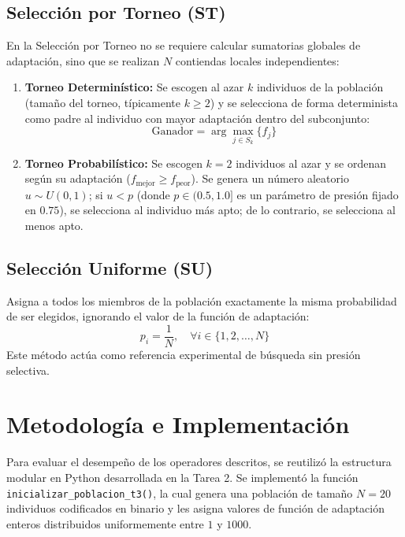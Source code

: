 \documentclass[11pt,letterpaper]{article}
\begin{document}
\subsection{Selección por Torneo (ST)}
En la Selección por Torneo no se requiere calcular sumatorias globales de adaptación, sino que se realizan $N$ contiendas locales independientes:
\begin{enumerate}
    \item \textbf{Torneo Determinístico:} Se escogen al azar $k$ individuos de la población (tamaño del torneo, típicamente $k \ge 2$) y se selecciona de forma determinista como padre al individuo con mayor adaptación dentro del subconjunto:
    \begin{equation}
        \text{Ganador} = \arg\max_{j \in S_k} \{f_j\}
    \end{equation}
    \item \textbf{Torneo Probabilístico:} Se escogen $k=2$ individuos al azar y se ordenan según su adaptación ($f_{\text{mejor}} \ge f_{\text{peor}}$). Se genera un número aleatorio $u \sim U(0,1)$; si $u < p$ (donde $p \in (0.5, 1.0]$ es un parámetro de presión fijado en $0.75$), se selecciona al individuo más apto; de lo contrario, se selecciona al menos apto.
\end{enumerate}

\subsection{Selección Uniforme (SU)}
Asigna a todos los miembros de la población exactamente la misma probabilidad de ser elegidos, ignorando el valor de la función de adaptación:
\begin{equation}
    p_i = \frac{1}{N}, \quad \forall i \in \{1, 2, \dots, N\}
\end{equation}
Este método actúa como referencia experimental de búsqueda sin presión selectiva.

\section{Metodología e Implementación}
Para evaluar el desempeño de los operadores descritos, se reutilizó la estructura modular en Python desarrollada en la Tarea 2. Se implementó la función \texttt{inicializar\_poblacion\_t3()}, la cual genera una población de tamaño $N = 20$ individuos codificados en binario y les asigna valores de función de adaptación enteros distribuidos uniformemente entre $1$ y $1000$. 
\end{document}
